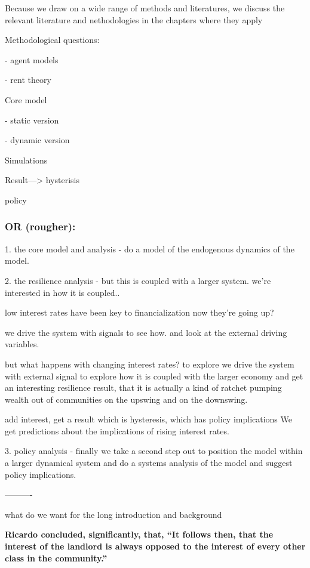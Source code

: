 \color{red}
Because we draw on a wide range of methods and literatures, we discuss the relevant literature and  nethodologies in the chapters where they apply 

\color{black}


Methodological questions: 

    - agent models 
    
    - rent theory

Core model

    - static version
    
    - dynamic version

Simulations

Result---> hysterisis

policy

\subsubsection{OR (rougher):}

1. the core model and analysis - do a model of the endogenous dynamics of the model.

2. the resilience analysis -
but this is coupled with a larger system. we're interested in how it is coupled..

low interest rates have been key to financialization 
now they're going up?

we drive the system with signals to see how. and look at the external driving variables.

but what happens with changing interest rates? to explore we drive the system with external signal to explore how it is coupled with the larger economy and get an interesting resilience result, that it is actually a kind of ratchet pumping wealth out of communities on the upswing and on the downswing.

add interest, get a result which is hysteresis, which has policy implications
We get predictions about the implications of rising interest rates.

3.  policy analysis - finally we take a second step out to position the model within a larger dynamical system and do a systems analysis of the model and suggest policy implications. 

----------

what do we want for the long introduction and background

\textbf{Ricardo concluded, significantly, that, ``It follows then, that the interest of the landlord is always opposed to the interest of every other class in the community.'' }


